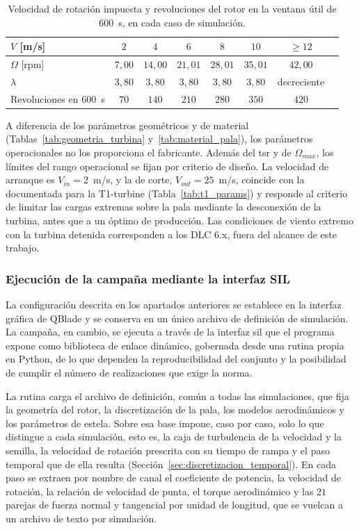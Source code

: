 \begin{table}[H]
    \centering
    \caption{Velocidad de rotación impuesta y revoluciones del rotor en la ventana útil de $600$~s, en cada caso de simulación.}
    \label{tab:rpm_por_velocidad}
    \begin{tabular}{lccccccc}
        \hline
        \textbf{$V$ [m/s]} & $2$ & $4$ & $6$ & $8$ & $10$ & $\geq 12$ \\
        \hline
        $\Omega$ [rpm] & $7{,}00$ & $14{,}00$ & $21{,}01$ & $28{,}01$ & $35{,}01$ & $42{,}00$ \\
        $\lambda$ & $3{,}80$ & $3{,}80$ & $3{,}80$ & $3{,}80$ & $3{,}80$ & decreciente \\
        Revoluciones en $600$~s & $70$ & $140$ & $210$ & $280$ & $350$ & $420$ \\
        \hline
    \end{tabular}
\end{table}

A diferencia de los parámetros geométricos y de material (Tablas~\ref{tab:geometria_turbina} y~\ref{tab:material_pala}), los parámetros operacionales no los proporciona el fabricante. Además del \gls{tsr} y de $\Omega_{max}$, los límites del rango operacional se fijan por criterio de diseño. La velocidad de arranque es $V_{in} = 2$~m/s, y la de corte, $V_{out} = 25$~m/s, coincide con la documentada para la T1-turbine (Tabla~\ref{tab:t1_params}) y responde al criterio de limitar las cargas extremas sobre la pala mediante la desconexión de la turbina, antes que a un óptimo de producción. Las condiciones de viento extremo con la turbina detenida corresponden a los DLC 6.x, fuera del alcance de este trabajo.


\subsubsection{Ejecución de la campaña mediante la interfaz SIL}
\label{sec:sil}

La configuración descrita en los apartados anteriores se establece en la interfaz gráfica de QBlade y se conserva en un único archivo de definición de simulación. La campaña, en cambio, se ejecuta a través de la interfaz \gls{sil} que el programa expone como biblioteca de enlace dinámico, gobernada desde una rutina propia en Python, de lo que dependen la reproducibilidad del conjunto y la posibilidad de cumplir el número de realizaciones que exige la norma.

La rutina carga el archivo de definición, común a todas las simulaciones, que fija la geometría del rotor, la discretización de la pala, los modelos aerodinámicos y los parámetros de estela. Sobre esa base impone, caso por caso, solo lo que distingue a cada simulación, esto es, la caja de turbulencia de la velocidad y la semilla, la velocidad de rotación prescrita con su tiempo de rampa y el paso temporal que de ella resulta (Sección~\ref{sec:discretizacion_temporal}). En cada paso se extraen por nombre de canal el coeficiente de potencia, la velocidad de rotación, la relación de velocidad de punta, el torque aerodinámico y las $21$ parejas de fuerza normal y tangencial por unidad de longitud, que se vuelcan a un archivo de texto por simulación.

